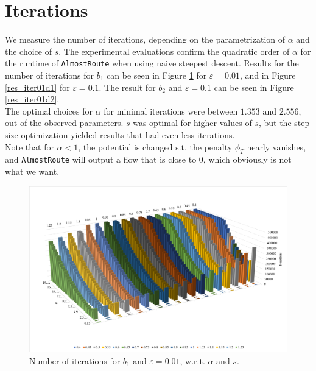 \section{Iterations}
We measure the number of iterations, depending on the parametrization of $\alpha$ and the choice of $s$.
The experimental evaluations confirm the quadratic order of $\alpha$ for the runtime of \texttt{AlmostRoute} when using naive steepest descent. Results for the number of iterations for $b_1$ can be seen in Figure \ref{res_iter001d1} for $\varepsilon=0.01$, and in Figure \ref{res_iter01d1} for $\varepsilon=0.1$. The result for $b_2$ and $\varepsilon=0.1$ can be seen in Figure \ref{res_iter01d2}.\\
The optimal choices for $\alpha$ for minimal iterations were between $1.353$ and $2.556$, out of the observed parameters. $s$ was optimal for higher values of $s$, but the step size optimization yielded results that had even less iterations.\\
Note that for $\alpha<1$, the potential is changed s.t. the penalty $\phi_T$ nearly vanishes, and \texttt{AlmostRoute} will output a flow that is close to $0$, which obviously is not what we want.
\begin{figure}
\begin{center}
\includegraphics[scale=.55]{Iter-eps001-d1.png}
\end{center}
\caption{Number of iterations for $b_1$ and $\varepsilon=0.01$, w.r.t. $\alpha$ and $s$.}\label{res_iter001d1}
\end{figure}
